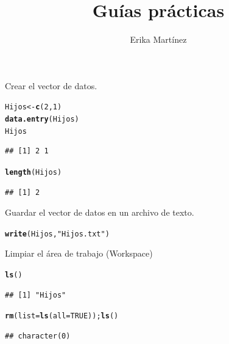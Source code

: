 \documentclass[10pt,a4paper]{article}\usepackage[]{graphicx}\usepackage[]{color}
\author{Erika Martínez}
\title{Guías prácticas}
\makeatletter
\newcommand{\hlnum}[1]{\textcolor[rgb]{0.686,0.059,0.569}{#1}}%
\newcommand{\hlstr}[1]{\textcolor[rgb]{0.192,0.494,0.8}{#1}}%
\newcommand{\hlstd}[1]{\textcolor[rgb]{0.345,0.345,0.345}{#1}}%
\newcommand{\hlkwb}[1]{\textcolor[rgb]{0.69,0.353,0.396}{#1}}%
\newcommand{\hlkwc}[1]{\textcolor[rgb]{0.333,0.667,0.333}{#1}}%
\newcommand{\hlkwd}[1]{\textcolor[rgb]{0.737,0.353,0.396}{\textbf{#1}}}%
\newenvironment{kframe}{%
 \def\at@end@of@kframe{}%
 \ifinner\ifhmode%
  \def\at@end@of@kframe{\end{minipage}}%
  \begin{minipage}{\columnwidth}%
 \fi\fi%
 \def\FrameCommand##1{\hskip\@totalleftmargin \hskip-\fboxsep
 \colorbox{shadecolor}{##1}\hskip-\fboxsep
     \hskip-\linewidth \hskip-\@totalleftmargin \hskip\columnwidth}%
 \MakeFramed {\advance\hsize-\width
   \@totalleftmargin\z@ \linewidth\hsize
   \@setminipage}}%
 {\par\unskip\endMakeFramed%
 \at@end@of@kframe}
\newenvironment{knitrout}{}{} %
\makeatother
\begin{document}
\maketitle
\newpage


Crear el vector de datos.
\begin{knitrout}
\color{fgcolor}\begin{kframe}
\begin{alltt}
\hlstd{Hijos} \hlkwb{<-} \hlkwd{c}\hlstd{(}\hlnum{2}\hlstd{,} \hlnum{1}\hlstd{)}
\hlkwd{data.entry}\hlstd{(Hijos)}
\hlstd{Hijos}
\end{alltt}
\begin{verbatim}
## [1] 2 1
\end{verbatim}
\begin{alltt}
\hlkwd{length}\hlstd{(Hijos)}
\end{alltt}
\begin{verbatim}
## [1] 2
\end{verbatim}
\end{kframe}
\end{knitrout}


Guardar el vector de datos en un archivo de texto.
\begin{knitrout}
\color{fgcolor}\begin{kframe}
\begin{alltt}
\hlkwd{write}\hlstd{(Hijos,} \hlstr{"Hijos.txt"}\hlstd{)}
\end{alltt}
\end{kframe}
\end{knitrout}

Limpiar el área de trabajo (Workspace)
\begin{knitrout}
\color{fgcolor}\begin{kframe}
\begin{alltt}
\hlkwd{ls}\hlstd{()}
\end{alltt}
\begin{verbatim}
## [1] "Hijos"
\end{verbatim}
\begin{alltt}
\hlkwd{rm}\hlstd{(}\hlkwc{list}\hlstd{=}\hlkwd{ls}\hlstd{(}\hlkwc{all}\hlstd{=}\hlnum{TRUE}\hlstd{));} \hlkwd{ls}\hlstd{()}
\end{alltt}
\begin{verbatim}
## character(0)
\end{verbatim}
\end{kframe}
\end{knitrout}
\end{document}
